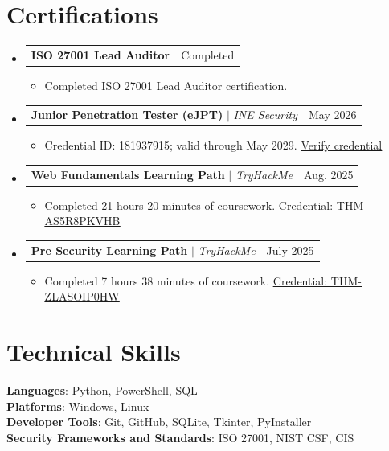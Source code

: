 \documentclass[letterpaper,11pt]{article}
\makeatletter
\newcommand{\resumeItem}[1]{
  \item\small{{#1 \vspace{-2pt}}}
}
\newcommand{\resumeProjectHeading}[2]{
  \item
    \begin{tabular*}{0.97\textwidth}{l@{\extracolsep{\fill}}r}
      \small#1 & #2 \\
    \end{tabular*}\vspace{-7pt}
}
\newcommand{\resumeSubHeadingListStart}{\begin{itemize}[leftmargin=0.15in, label={}]}
\newcommand{\resumeSubHeadingListEnd}{\end{itemize}}
\newcommand{\resumeItemListStart}{\begin{itemize}}
\newcommand{\resumeItemListEnd}{\end{itemize}\vspace{-5pt}}
\makeatother
\begin{document}
\section{Certifications}
  \resumeSubHeadingListStart
    \resumeProjectHeading
      {\textbf{ISO 27001 Lead Auditor}}{Completed}
      \resumeItemListStart
        \resumeItem{Completed ISO 27001 Lead Auditor certification.}
      \resumeItemListEnd
    \resumeProjectHeading
      {\textbf{Junior Penetration Tester (eJPT)} $|$ \emph{INE Security}}{May 2026}
      \resumeItemListStart
        \resumeItem{Credential ID: 181937915; valid through May 2029. \href{https://www.credential.net/cb80ab6a-9d09-4139-83dc-7a674bad2b0a}{\underline{Verify credential}}}
      \resumeItemListEnd
    \resumeProjectHeading
      {\textbf{Web Fundamentals Learning Path} $|$ \emph{TryHackMe}}{Aug. 2025}
      \resumeItemListStart
        \resumeItem{Completed 21 hours 20 minutes of coursework. \href{https://tryhackme-certificates.s3-eu-west-1.amazonaws.com/THM-AS5R8PKVHB.pdf}{\underline{Credential: THM-AS5R8PKVHB}}}
      \resumeItemListEnd
    \resumeProjectHeading
      {\textbf{Pre Security Learning Path} $|$ \emph{TryHackMe}}{July 2025}
      \resumeItemListStart
        \resumeItem{Completed 7 hours 38 minutes of coursework. \href{https://tryhackme-certificates.s3-eu-west-1.amazonaws.com/THM-ZLASOIP0HW.pdf}{\underline{Credential: THM-ZLASOIP0HW}}}
      \resumeItemListEnd
  \resumeSubHeadingListEnd

\section{Technical Skills}
  \begin{itemize}[leftmargin=0.15in, label={}]
    \small{\item{
      \textbf{Languages}{: Python, PowerShell, SQL} \\
      \textbf{Platforms}{: Windows, Linux} \\
      \textbf{Developer Tools}{: Git, GitHub, SQLite, Tkinter, PyInstaller} \\
      \textbf{Security Frameworks and Standards}{: ISO 27001, NIST CSF, CIS}
    }}
  \end{itemize}
\end{document}
